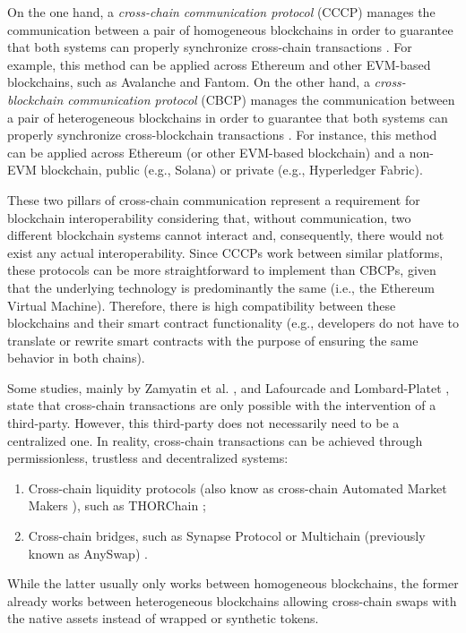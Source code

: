 \documentclass[runningheads]{llncs}
\begin{document}
On the one hand, a \textit{cross-chain communication protocol} (CCCP) manages the communication between a pair of homogeneous blockchains in order to guarantee that both systems can properly synchronize cross-chain transactions \cite{survey}. For example, this method can be applied across Ethereum and other EVM-based blockchains, such as Avalanche and Fantom. On the other hand, a \textit{cross-blockchain communication protocol} (CBCP) manages the communication between a pair of heterogeneous blockchains in order to guarantee that both systems can properly synchronize cross-blockchain transactions \cite{survey}. For instance, this method can be applied across Ethereum (or other EVM-based blockchain) and a non-EVM blockchain, public (e.g., Solana) or private (e.g., Hyperledger Fabric). 

These two pillars of cross-chain communication represent a requirement for blockchain interoperability considering that, without communication, two different blockchain systems cannot interact and, consequently, there would not exist any actual interoperability. Since CCCPs work between similar platforms, these protocols can be more straightforward to implement than CBCPs, given that the underlying technology is predominantly the same (i.e., the Ethereum Virtual Machine). Therefore, there is high compatibility between these blockchains and their smart contract functionality (e.g., developers do not have to translate or rewrite smart contracts with the purpose of ensuring the same behavior in both chains).

Some studies, mainly by Zamyatin et al. \cite{zamyatin_2019}, and Lafourcade and Lombard-Platet \cite{lafourcade_lombard-platet_2020}, state that cross-chain transactions are only possible with the intervention of a third-party. However, this third-party does not necessarily need to be a centralized one. In reality, cross-chain transactions can be achieved through permissionless, trustless and decentralized systems:
\begin{enumerate}
    \item Cross-chain liquidity protocols (also know as cross-chain Automated Market Makers \cite{amm}), such as THORChain \cite{thorchain_2020};
    \item Cross-chain bridges, such as Synapse Protocol \cite{synapse_2021} or Multichain (previously known as AnySwap) \cite{multichain_2020}.
\end{enumerate}

While the latter usually only works between homogeneous blockchains, the former already works between heterogeneous blockchains allowing cross-chain swaps with the native assets instead of wrapped or synthetic tokens.
\end{document}
